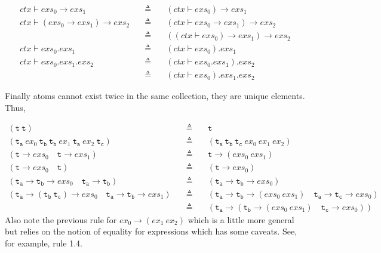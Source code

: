 \documentclass[a4paper,11pt]{article}
\begin{document}
\begin{eqnarray*}
ctx \vdash exs_0 \rightarrow exs_1 \quad&\triangleq&\quad (ctx \vdash exs_0) \rightarrow exs_1 \\
ctx \vdash (exs_0 \rightarrow exs_1) \rightarrow exs_2 \quad&\triangleq&\quad (ctx \vdash exs_0 \rightarrow exs_1) \rightarrow exs_2 \\
                                                            &\triangleq&\quad ((ctx \vdash exs_0) \rightarrow exs_1) \rightarrow exs_2 \\
ctx \vdash exs_0.exs_1 \quad&\triangleq&\quad (ctx \vdash exs_0).exs_1 \\
ctx \vdash exs_0.exs_1.exs_2 \quad&\triangleq&\quad (ctx \vdash exs_0.exs_1).exs_2 \\
                                  &\triangleq&\quad (ctx \vdash exs_0).exs_1.exs_2
\end{eqnarray*}

Finally atoms cannot exist twice in the same collection, they are unique elements. Thus,

\begin{eqnarray*}
(\mathtt{t}\ \mathtt{t}) \quad&\triangleq&\quad \mathtt{t} \\
(\mathtt{t_a}\ ex_0\ \mathtt{t_b}\ \mathtt{t_b}\ ex_1\ \mathtt{t_a}\ ex_2\ \mathtt{t_c}) \quad&\triangleq&\quad (\mathtt{t_a}\ \mathtt{t_b}\ \mathtt{t_c}\ ex_0\ ex_1\ ex_2) \\
(\mathtt{t} \rightarrow exs_0 \quad \mathtt{t} \rightarrow exs_1) \quad&\triangleq&\quad \mathtt{t} \rightarrow (exs_0\ exs_1) \\
(\mathtt{t} \rightarrow exs_0 \quad \mathtt{t}) \quad&\triangleq&\quad (\mathtt{t} \rightarrow exs_0) \\
(\mathtt{t_a} \rightarrow \mathtt{t_b} \rightarrow exs_0 \quad \mathtt{t_a} \rightarrow \mathtt{t_b}) \quad&\triangleq&\quad (\mathtt{t_a} \rightarrow \mathtt{t_b} \rightarrow exs_0) \\
(\mathtt{t_a} \rightarrow (\mathtt{t_b}\ \mathtt{t_c}) \rightarrow exs_0 \quad \mathtt{t_a} \rightarrow \mathtt{t_b} \rightarrow exs_1) \quad&\triangleq&\quad (\mathtt{t_a} \rightarrow \mathtt{t_b} \rightarrow (exs_0\ exs_1) \quad \mathtt{t_a} \rightarrow \mathtt{t_c} \rightarrow exs_0)\\
    \quad&\triangleq&\quad (\mathtt{t_a} \rightarrow (\mathtt{t_b} \rightarrow (exs_0\ exs_1) \quad \mathtt{t_c} \rightarrow exs_0))
\end{eqnarray*}
Also note the previous rule for $ex_0 \rightarrow (ex_1\ ex_2)$ which is a little more general but relies on the notion of equality for expressions which has some caveats. See, for example, rule 1.4.
\end{document}
